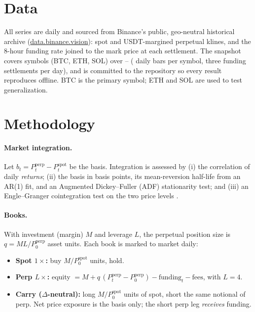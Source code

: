 \documentclass[11pt]{article}
\begin{document}
\section{Data}
All series are daily and sourced from Binance's public, geo-neutral historical
archive (\href{https://data.binance.vision}{data.binance.vision}): spot and
USDT-margined perpetual klines, and the 8-hour funding rate joined to the mark
price at each settlement. The snapshot covers \nSymbols{} symbols (BTC, ETH, SOL)
over \dataStart{}--\dataEnd{} (\nBars{} daily bars per symbol, three funding
settlements per day), and is committed to the repository so every result
reproduces offline. BTC is the primary symbol; ETH and SOL are used to test
generalization.

\section{Methodology}

\paragraph{Market integration.} Let $b_t = P^{\text{perp}}_t - P^{\text{spot}}_t$
be the basis. Integration is assessed by (i) the correlation of daily
\emph{returns}; (ii) the basis in basis points, its mean-reversion half-life from
an AR(1) fit, and an Augmented Dickey--Fuller (ADF) stationarity test; and (iii) an
Engle--Granger cointegration test on the two price levels \cite{englegranger1987}.

\paragraph{Books.} With investment (margin) $M$ and leverage $L$, the perpetual
position size is $q = M L / P^{\text{perp}}_0$ asset units. Each book is marked to
market daily:
\begin{itemize}
  \item \textbf{Spot $1\times$:} buy $M / P^{\text{spot}}_0$ units, hold.
  \item \textbf{Perp $L\times$:} equity $= M + q\,(P^{\text{perp}}_t - P^{\text{perp}}_0)
        - \text{funding}_t - \text{fees}$, with $L = 4$.
  \item \textbf{Carry ($\Delta$-neutral):} long $M/P^{\text{spot}}_0$ units of spot,
        short the same notional of perp. Net price exposure is the basis only; the
        short perp leg \emph{receives} funding.
\end{itemize}
\end{document}
